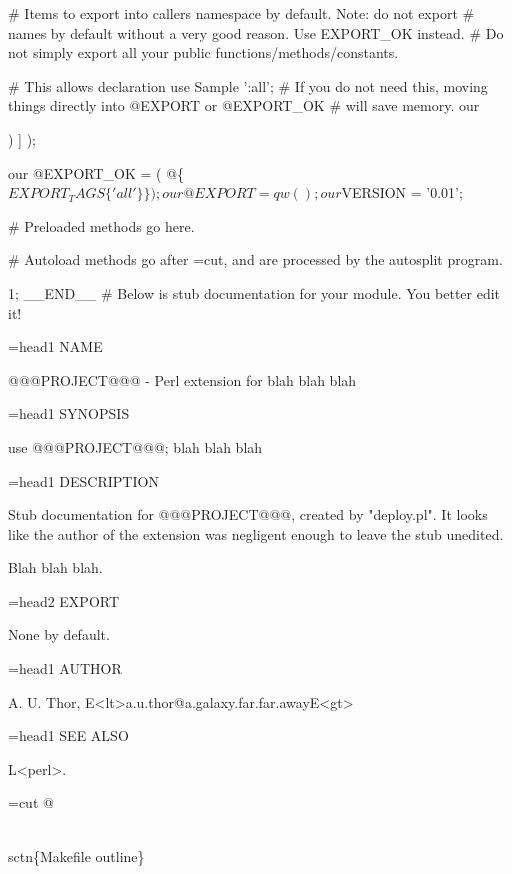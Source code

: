 \documentclass[11pt]{article}
\def\nwendcode{\endtrivlist \endgroup} %
\let\nwdocspar=\par                    %
\begin{document}
# Items to export into callers namespace by default. Note: do not export
# names by default without a very good reason. Use EXPORT_OK instead.
# Do not simply export all your public functions/methods/constants.

# This allows declaration       use Sample ':all';
# If you do not need this, moving things directly into @EXPORT or @EXPORT_OK
# will save memory.
our %

) ] );

our @EXPORT_OK = ( @\{ $EXPORT_TAGS\{'all'\} \} );

our @EXPORT = qw(

);
our $VERSION = '0.01';


# Preloaded methods go here.

# Autoload methods go after =cut, and are processed by the autosplit program.

1;
__END__
# Below is stub documentation for your module. You better edit it!

=head1 NAME

@@@PROJECT@@@ - Perl extension for blah blah blah

=head1 SYNOPSIS

  use @@@PROJECT@@@;
  blah blah blah

=head1 DESCRIPTION

Stub documentation for @@@PROJECT@@@, created by "deploy.pl". 
It looks like the author of the extension was negligent 
enough to leave the stub unedited.

Blah blah blah.

=head2 EXPORT

None by default.


=head1 AUTHOR

A. U. Thor, E<lt>a.u.thor@a.galaxy.far.far.awayE<gt>

=head1 SEE ALSO

L<perl>.

=cut
@
\nwendcode{}\nwdocspar


\nwenddocs{}\plusendmoddef
\\sctn\{Makefile outline\}
\end{document}
